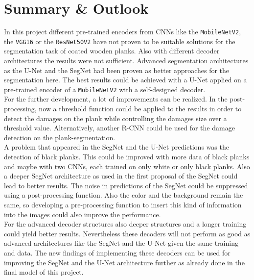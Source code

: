 \section{Summary \& Outlook}
In this project different pre-trained encoders from CNNs like the \verb|MobileNetV2|, the \verb|VGG16| or the \verb|ResNet50V2| have not proven to be suitable solutions for the segmentation task of coated wooden planks. Also with different decoder architectures the results were not sufficient. Advanced segmentation architectures as the U-Net and the SegNet had been proven as better approaches for the segmentation here. The best results could be achieved with a U-Net applied on a pre-trained encoder of a \verb|MobileNetV2| with a self-designed decoder.\\
For the further development, a lot of improvements can be realized. In the post-processing, now a threshold function could be applied to the results in order to detect the damages on the plank while controlling the damages size over a threshold value. Alternatively, another R-CNN could be used for the damage detection on the plank-segmentation.\\
A problem that appeared in the SegNet and the U-Net predictions was the detection of black planks. This could be improved with more data of black planks and maybe with two CNNs, each trained on only white or only black planks. Also a deeper SegNet architecture as used in the first proposal of the SegNet \cite{Badrinarayanan.2017} could lead to better results. The noise in predictions of the SegNet could be suppressed using a post-processing function. Also the color and the background remain the same, so developing a pre-processing function to insert this kind of information into the images could also improve the performance.\\
For the advanced decoder structures also deeper structures and a longer training could yield better results. Nevertheless these decoders will not perform as good as advanced architectures like the SegNet and the U-Net given the same training and data. The new findings of implementing these decoders can be used for improving the SegNet and the U-Net architecture further as already done in the final model of this project.\\
